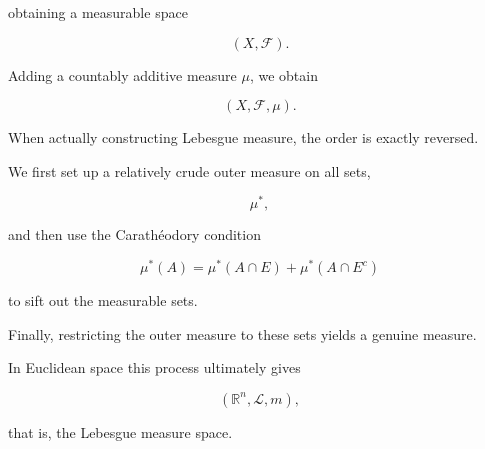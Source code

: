 \documentclass[11pt]{article}
\begin{document}
obtaining a measurable space

\[
(X,\mathcal{F}).
\]

Adding a countably additive measure $\mu$, we obtain

\[
(X,\mathcal{F},\mu).
\]

When actually constructing Lebesgue measure, the order is exactly reversed.

We first set up a relatively crude outer measure on all sets,

\[
\mu^{*},
\]

and then use the Carathéodory condition

\[
\mu^{*}(A)=\mu^{*}(A\cap E)+\mu^{*}(A\cap E^{c})
\]

to sift out the measurable sets.

Finally, restricting the outer measure to these sets yields a genuine measure.

In Euclidean space this process ultimately gives

\[
(\mathbb{R}^{n},\mathcal{L},m),
\]

that is, the Lebesgue measure space.
\end{document}
